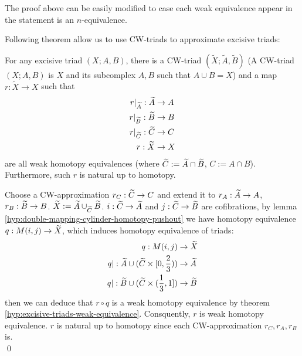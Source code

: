     \begin{note}
        The proof above can be easily modified to case each weak equivalence appear in the statement is an $n$-equivalence.\\
    \end{note}

    Following theorem allow us to use CW-triads to approximate excisive triads:

    \begin{thm}
        For any excisive triad $(X;A,B)$,
        there is a CW-triad $(\widetilde{X}; \widetilde{A}, \widetilde{B})$
        (A CW-triad $(X;A,B)$ is $X$ and its subcomplex $A,B$ such that $A \cup B = X$)
        and a map $r : \widetilde{X} \to X$
        such that
        \begin{align*}
            r|_{\widetilde{A}} : \widetilde{A} & \to A\\
            r|_{\widetilde{B}} :  \widetilde{B} & \to B \\
            r|_{\widetilde{C}} : \widetilde{C} & \to C\\
            r  : \widetilde{X} & \to X
        \end{align*}
        are all weak homotopy equivalences (where $\widetilde{C} := \widetilde{A} \cap \widetilde{B}$, $C := A \cap B$).
        Furthermore, such $r$ is natural up to homotopy.
    \end{thm}

    \begin{prf}
        Choose a CW-approximation $r_C : \widetilde{C} \to C$
        and extend it to $r_A : \widetilde{A} \to A$, $r_B : \widetilde{B} \to B$.
        $\widetilde{X} := \widetilde{A} \cup_{\widetilde{C}} \widetilde{B}$.
        $i : \widetilde{C} \to \widetilde{A} $ and $j : \widetilde{C} \to \widetilde{B}$
        are cofibrations,
        by lemma \ref{hyp:double-mapping-cylinder-homotopy-pushout}
        we have homotopy equivalence $q : M(i,j) \to \widetilde{X}$,
        which induces homotopy equivalence of triads:
        \begin{align*}
            q : M(i,j) & \to \widetilde{X}\\
            q| : \widetilde{A} \cup (\widetilde{C} \times [0,\frac{2}{3})) & \to \widetilde{A}\\
            q| : \widetilde{B} \cup (\widetilde{C} \times (\frac{1}{3},1]) & \to \widetilde{B}\\
        \end{align*}
        then we can deduce that
        $r \circ q$
        is a weak homotopy equivalence by theorem \ref{hyp:excisive-triads-weak-equivalence}.
        Consquently, $r$ is weak homotopy equivalence.
        $r$ is natural up to homotopy since each CW-approximation $r_C, r_A, r_B$ is.\\
        \qed
    \end{prf}
    
